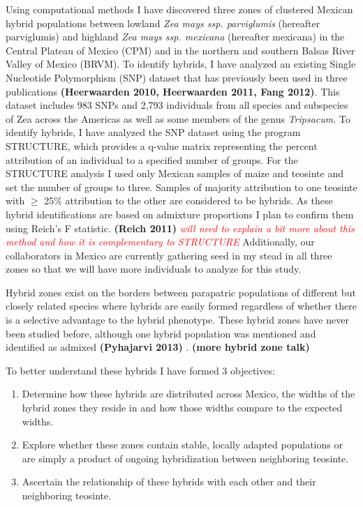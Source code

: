 \documentclass[12pt]{amsart}
\newcommand{\mbh}[1]{\textcolor{red}{ \emph{\scriptsize  #1}} }
\begin{document}
Using computational methods I have discovered three zones of clustered Mexican hybrid populations between lowland \textit{Zea mays ssp. parviglumis} (hereafter parviglumis) and highland \textit{Zea mays ssp. mexicana} (hereafter mexicana) in the Central Plateau of Mexico (CPM) and in the northern and southern Balsas River Valley of Mexico (BRVM). 
To identify hybrids, I have analyzed an existing Single Nucleotide Polymorphism (SNP) dataset that has previously been used in three publications \textbf{(Heerwaarden 2010, Heerwaarden 2011, Fang 2012)}.  
This dataset includes 983 SNPs and 2,793 individuals from all species and subspecies of Zea across the Americas as well as some members of the genus \textit{Tripsacum}.  
To identify hybrids, I have analyzed the SNP dataset using the program STRUCTURE, which provides a q-value matrix representing the percent attribution of an individual to a specified number of groups.  
For the STRUCTURE analysis I used only Mexican samples of maize and teosinte and set the number of groups to three.
Samples of majority attribution to one teosinte with $\geq$ 25\% attribution to the other are considered to be hybrids.
As these hybrid identifications are based on admixture proportions I plan to confirm them using Reich's F statistic. \textbf{(Reich  2011)}\mbh{will need to explain a bit more about this method and how it is complementary to STRUCTURE}
Additionally, our collaborators in Mexico are currently gathering seed in my stead in all three zones so that we will have more individuals to analyze for this study.

Hybrid zones exist on the borders between parapatric populations of different but closely related species where hybrids are easily formed regardless of whether there is a selective advantage to the hybrid phenotype.
These hybrid zones have never been studied before, although one hybrid population was mentioned and identified as admixed \textbf{(Pyhajarvi 2013)} . \textbf{(more hybrid zone talk)} %


To better understand these hybrids I have formed 3 objectives: 
\begin{enumerate} 
	\item Determine how these hybrids are distributed across Mexico, the widths of the hybrid zones they reside in and how those widths compare to the expected widths.
	\item Explore whether these zones contain stable, locally adapted populations or are simply a product of ongoing hybridization between neighboring teosinte.
	\item Ascertain the relationship of these hybrids with each other and their neighboring teosinte.
\end{enumerate} 
\end{document}
